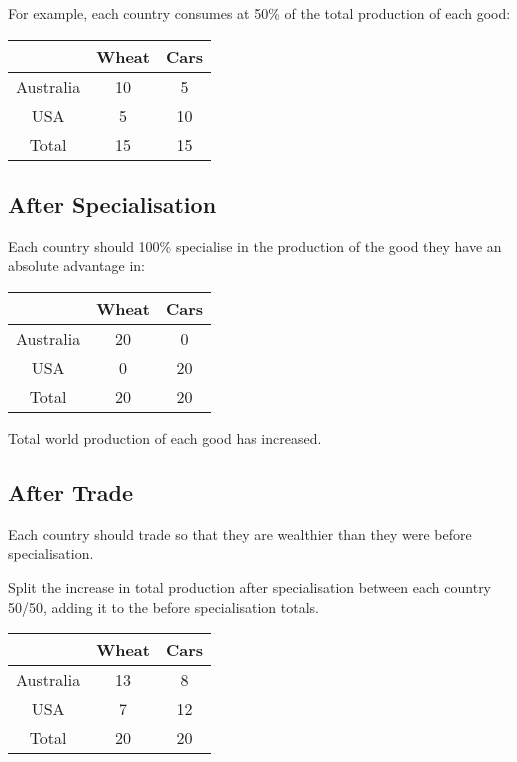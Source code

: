 \documentclass[a4paper,11pt]{article}
\begin{document}
For example, each country consumes at 50\% of the total production of each
good:

\begin{center}
\begin{tabular}{c|c|c}
& Wheat & Cars \\
\hline
Australia & 10 & 5  \\
USA       & 5  & 10 \\
Total     & 15 & 15 \\
\end{tabular}
\end{center}


\subsection{After Specialisation}

Each country should 100\% specialise in the production of the good they have an
absolute advantage in:

\begin{center}
\begin{tabular}{c|c|c}
& Wheat & Cars \\
\hline
Australia & 20 & 0  \\
USA       & 0  & 20 \\
Total     & 20 & 20 \\
\end{tabular}
\end{center}

Total world production of each good has increased.


\subsection{After Trade}

Each country should trade so that they are wealthier than they were before
specialisation.

Split the increase in total production after specialisation between each
country 50/50, adding it to the before specialisation totals.

\begin{center}
\begin{tabular}{c|c|c}
& Wheat & Cars \\
\hline
Australia & 13 & 8  \\
USA       & 7  & 12 \\
Total     & 20 & 20 \\
\end{tabular}
\end{center}
\end{document}
